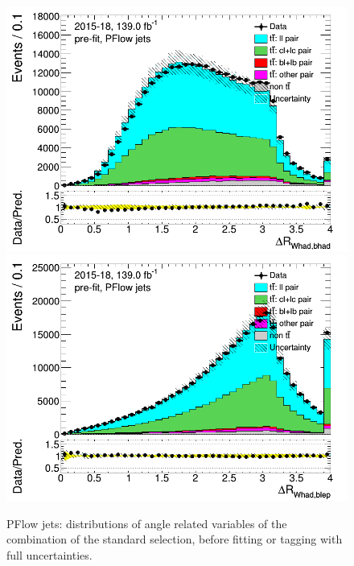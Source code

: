 \begin{figure}[H]
\includegraphics[width=.45\textwidth]{FTAG_plots/pretagNoRwwithouthighpTPFlowall/DataMC_h_dRWhadbhad.png} 
\includegraphics[width=.45\textwidth]{FTAG_plots/pretagNoRwwithouthighpTPFlowall/DataMC_h_dRWhadblep.png} \\
\caption{PFlow jets: distributions of angle related variables of the combination of the standard selection,
 before fitting or 
tagging with full uncertainties.} \label{fig:standard_angles_PFlow}
\end{figure}

